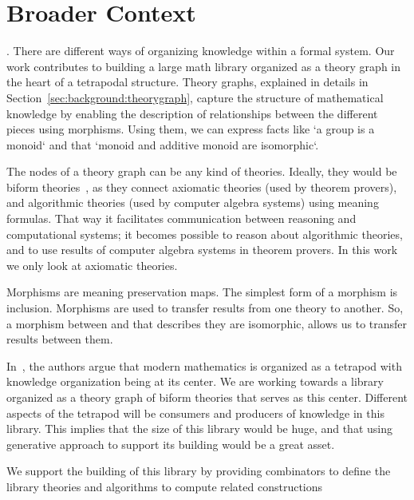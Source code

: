 \section{Broader Context}. 
\label{sec:broader_context}
There are different ways of organizing knowledge within a formal system. Our work contributes to building a large math library organized as a theory graph in the heart of a tetrapodal structure. Theory graphs, explained in details in Section~\ref{sec:background:theorygraph}, capture the structure of mathematical knowledge by enabling the description of relationships between the different pieces using morphisms. Using them, we can express facts like `a group is a monoid` and that `monoid and additive monoid are isomorphic`. 

The nodes of a theory graph can be any kind of theories. Ideally, they would be biform theories~\cite{biformCICM2018}, as they connect axiomatic theories (used by theorem provers), and algorithmic theories (used by computer algebra systems) using meaning formulas. That way it facilitates communication between reasoning and computational systems; it becomes possible to reason about algorithmic theories, and to use results of computer algebra systems in theorem provers. In this work we only look at axiomatic theories. 

Morphisms are meaning preservation maps. The simplest form of a morphism is inclusion. Morphisms are used to transfer results from one theory to another. So, a morphism between  and  that describes they are isomorphic, allows us to transfer results between them. 

In~\cite{carette2020bigMath}, the authors argue that modern mathematics is organized as a tetrapod with knowledge organization being at its center. We are working towards a library organized as a theory graph of biform theories that serves as this center. Different aspects of the tetrapod will be consumers and producers of knowledge in this library. This implies that the size of this library would be huge, and that using generative approach to support its building would be a great asset. 

We support the building of this library by providing combinators to define the library theories and algorithms to compute related constructions

